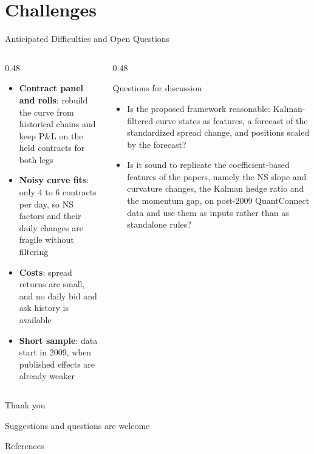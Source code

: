 \documentclass[10pt, aspectratio=169]{beamer}
\newcommand{\key}[1]{\textcolor{accent}{\textbf{#1}}}
\begin{document}
\section{Challenges}

\begin{frame}{Anticipated Difficulties and Open Questions}
\begin{columns}[T, onlytextwidth]
\begin{column}{0.48\textwidth}
\begin{itemize}\footnotesize
  \item \key{Contract panel and rolls}: rebuild the curve from historical chains and keep
        P\&L on the held contracts for both legs
  \item \key{Noisy curve fits}: only 4 to 6 contracts per day, so NS factors and their daily
        changes are fragile without filtering
  \item \key{Costs}: spread returns are small, and no daily bid and ask history is available
  \item \key{Short sample}: data start in 2009, when published effects are already weaker
\end{itemize}
\end{column}
\begin{column}{0.48\textwidth}
\begin{block}{Questions for discussion}
\begin{itemize}\footnotesize
  \item Is the proposed framework reasonable: Kalman-filtered curve states as features,
        a forecast of the standardized spread change, and positions scaled by the forecast?
  \item Is it sound to replicate the coefficient-based features of the papers, namely the NS
        slope and curvature changes, the Kalman hedge ratio and the momentum gap, on post-2009
        QuantConnect data and use them as inputs rather than as standalone rules?
\end{itemize}
\end{block}
\end{column}
\end{columns}
\end{frame}

\begin{frame}[standout]
  Thank you
  \vspace{1.5ex}

  {\normalsize Suggestions and questions are welcome}
\end{frame}

\appendix

\begin{frame}[allowframebreaks]{References}
\nocite{*}
\printbibliography[heading=none]
\end{frame}
\end{document}
